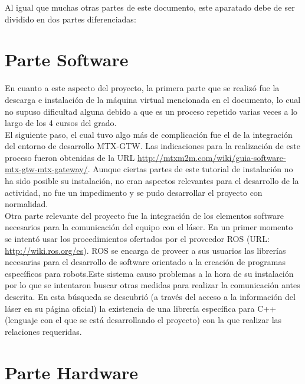 
Al igual que muchas otras partes de este documento, este aparatado debe de ser dividido en dos partes diferenciadas:

\section{Parte Software}

En cuanto a este aspecto del proyecto, la primera parte que se realizó fue la descarga e instalación de la máquina virtual mencionada en el documento, lo cual no supuso dificultad alguna debido a que es un proceso repetido varias veces a lo largo de los 4 cursos del grado.\\
El siguiente paso, el cual tuvo algo más de complicación fue el de la integración del entorno de desarrollo MTX-GTW. Las indicaciones para la realización de este proceso fueron obtenidas de la URL \url{http://mtxm2m.com/wiki/guia-software-mtx-gtw-mtx-gateway/}. Aunque ciertas partes de este tutorial de instalación no ha sido posible su instalación, no eran aspectos relevantes para el desarrollo de la actividad, no fue un impedimento y se pudo desarrollar el proyecto con normalidad.\\
Otra parte relevante del proyecto fue la integración de los elementos software necesarios para la comunicación del equipo con el láser. En un primer momento se intentó usar los procedimientos ofertados por el proveedor ROS (URL: \url{http://wiki.ros.org/es}). ROS se encarga de proveer a sus usuarios las librerías necesarias para el desarrollo de software orientado a la creación de programas específicos para robots.Este sistema causo problemas a la hora de su instalación por lo que se intentaron buscar otras medidas para realizar la comunicación antes descrita. En esta búsqueda se descubrió (a través del acceso a la información del láser en su página oficial) la existencia de una librería específica para  C++ (lenguaje con el que se está desarrollando el proyecto) con la que realizar las relaciones requeridas.

\section{Parte Hardware}

